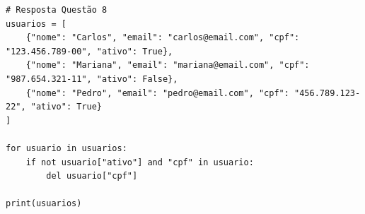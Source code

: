 \ifmostrarGabarito
\begin{verbatim}
# Resposta Questão 8
usuarios = [
    {"nome": "Carlos", "email": "carlos@email.com", "cpf": "123.456.789-00", "ativo": True},
    {"nome": "Mariana", "email": "mariana@email.com", "cpf": "987.654.321-11", "ativo": False},
    {"nome": "Pedro", "email": "pedro@email.com", "cpf": "456.789.123-22", "ativo": True}
]

for usuario in usuarios:
    if not usuario["ativo"] and "cpf" in usuario:
        del usuario["cpf"]

print(usuarios)
\end{verbatim}
\fi

